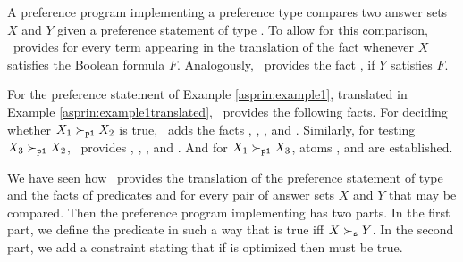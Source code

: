 A preference program implementing a preference type 
compares two answer sets $X$ and $Y$
given a preference statement  of type . %
To allow for this comparison, 
\asprin\ provides
for every term  appearing in the translation of 
the fact  
whenever $X$ satisfies the Boolean formula $F$.
Analogously, \asprin\ provides the fact , if $Y$ satisfies $F$.

\begin{example}
For the preference statement  of Example \ref{asprin:example1}, 
translated in Example \ref{asprin:example1translated}, \asprin\ provides the following facts. 
For deciding whether $X_1 \succ_{\texttt{p1}} X_2$ is true,
\asprin\ adds the facts
, , , and .
Similarly, for testing $X_3 \succ_{\texttt{p1}} X_2$, \asprin\ provides
, , ,  and .
And for $X_1 \succ_{\texttt{p1}} X_3$, 
atoms ,  and  are established.
\end{example}

We have seen how \asprin\ provides the translation of the preference statement  of type  
and the facts of predicates  and  
for every pair of answer sets $X$ and $Y$ that may be compared.
Then the preference program implementing  has two parts.
In the first part, we define the predicate  
in such a way that  is true 
iff $X \succ_{\texttt{s}} Y$.
In the second part, we add a constraint stating that 
if  is optimized then  must be true. 

